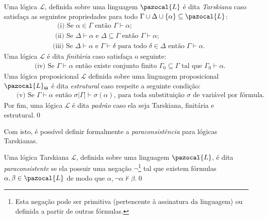 \begin{definicao}
    \label{def:padrao}
    Uma lógica $\mathcal{L}$, definida sobre uma linguagem $\pazocal{L}$ é dita \textit{Tarskiana} caso satisfaça as seguintes propriedades para todo $\Gamma \cup \Delta \cup \{\alpha\} \subseteq \pazocal{L}$:
    \begin{align*}
         & \text{~~(i) Se } \alpha \in \Gamma \text{ então } \Gamma \vdash \alpha;                                                                       \\
         & \text{~(ii) Se } \Delta \vdash \alpha \text{ e } \Delta \subseteq \Gamma \text{ então } \Gamma \vdash \alpha;                                 \\
         & \text{(iii) Se } \Delta \vdash \alpha \text{ e } \Gamma \vdash \delta \text{ para todo } \delta \in \Delta \text{ então } \Gamma \vdash \alpha.
    \end{align*}
    Uma lógica $\mathcal{L}$ é dita \textit{finitária} caso satisfaça o seguinte:
    \begin{align*}
         & \text{~(iv) Se } \Gamma \vdash \alpha \text{ então existe conjunto finito } \Gamma_{0} \subseteq \Gamma \text{ tal que } \Gamma_{0} \vdash \alpha.
    \end{align*}
    Uma lógica proposicional $\mathcal{L}$ definida sobre uma linguagem proposicional $\pazocal{L}_{\Theta}$ é dita \textit{estrutural} caso respeite a seguinte condição:
    \begin{align*}
         & \text{~~(v) Se } \Gamma \vdash \alpha \text{ então } \sigma |\Gamma| \vdash \sigma(\alpha) \text{, para toda substituição } \sigma \text{ de variável por fórmula.}
    \end{align*}
    Por fim, uma lógica $\mathcal{L}$ é dita \textit{padrão} caso ela seja Tarskiana, finitária e estrutural.\qed{}
\end{definicao}
Com isto, é possível definir formalmente a \textit{paraconsistência} para lógicas Tarskianas.

\begin{definicao}
    \label{def:tarskiana_paracons}
    Uma lógica Tarskiana $\mathcal{L}$, definida sobre uma linguagem $\pazocal{L}$, é dita \textit{paraconsistente} se ela possuir uma negação $\neg$\footnote{Esta negação pode ser primitiva (pertencente à assinatura da linguagem) ou definida a partir de outras fórmulas.} tal que existem fórmulas $\alpha, \beta \in \pazocal{L}$ de modo que $\alpha, \neg \alpha \nvdash \beta$.\qed{}
\end{definicao}

